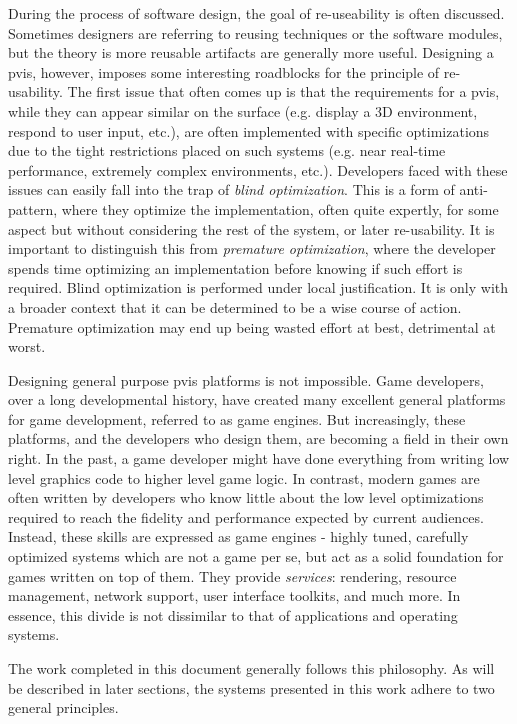 During the process of software design, the goal of re-useability is
often discussed. Sometimes designers are referring to reusing
techniques or the software modules, but the theory is more reusable
artifacts are generally more useful. Designing a \gls{pvis}, however,
imposes some interesting roadblocks for the principle of
re-usability. The first issue that often comes up is that the
requirements for a \gls{pvis}, while they can appear similar on the
surface (e.g. display a 3D environment, respond to user input, etc.),
are often implemented with specific optimizations due to the tight
restrictions placed on such systems (e.g. near real-time performance,
extremely complex environments, etc.). Developers faced with these
issues can easily fall into the trap of \textit{blind
  optimization}. This is a form of anti-pattern, where they optimize
the implementation, often quite expertly, for some aspect but without
considering the rest of the system, or later re-usability. It is
important to distinguish this from \textit{premature optimization},
where the developer spends time optimizing an implementation before
knowing if such effort is required. Blind optimization is performed
under local justification. It is only with a broader context that it
can be determined to be a wise course of action. Premature
optimization may end up being wasted effort at best, detrimental at
worst.

Designing general purpose \gls{pvis} platforms is not impossible. Game
developers, over a long developmental history, have created many
excellent general platforms for game development, referred to as game
engines. But increasingly, these platforms, and the developers who
design them, are becoming a field in their own right.  In the past, a
game developer might have done everything from writing low level
graphics code to higher level game logic. In contrast, modern games
are often written by developers who know little about the low level
optimizations required to reach the fidelity and performance expected
by current audiences. Instead, these skills are expressed as game
engines - highly tuned, carefully optimized systems which are not a
game per se, but act as a solid foundation for games written on top of
them. They provide \textit{services}: rendering, resource management,
network support, user interface toolkits, and much more. In essence,
this divide is not dissimilar to that of applications and operating
systems.

The work completed in this document generally follows this
philosophy. As will be described in later sections, the systems
presented in this work adhere to two general principles.

